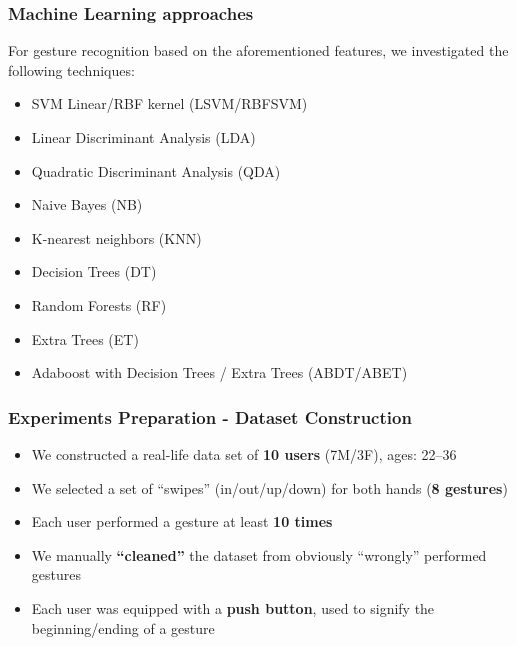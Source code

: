\begin{frame}
\frametitle{Machine Learning approaches}

For gesture recognition based on the aforementioned features,
we investigated the following techniques:
\begin{itemize}
\item SVM Linear/RBF kernel (LSVM/RBFSVM)
\item Linear Discriminant Analysis (LDA)
\item Quadratic Discriminant Analysis (QDA)
\item Naive Bayes (NB)
\item K-nearest neighbors (KNN)
\item Decision Trees (DT)
\item Random Forests (RF)
\item Extra Trees (ET)
\item Adaboost with Decision Trees / Extra Trees (ABDT/ABET)
\end{itemize}

\end{frame}


\begin{frame}
\frametitle{Experiments Preparation - Dataset Construction}
\begin{itemize}
\item We constructed a real-life data set of \textbf{10 users} (7M/3F), ages: 22–36
\item We selected a set of “swipes” (in/out/up/down) for both hands (\textbf{8 gestures})
\item Each user performed a gesture at least \textbf{10 times}
\item We manually \textbf{``cleaned''} the dataset from obviously ``wrongly'' performed gestures
\item Each user was equipped with a \textbf{push button}, used to signify the beginning/ending of a gesture
\end{itemize}
\end{frame}


